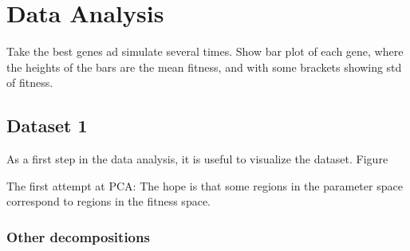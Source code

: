 
\chapter{Data Analysis} %

\label{chapter:model} %
	

Take the best genes ad simulate several times. Show bar plot of each gene, where the heights of the bars are the mean fitness, and with some brackets showing std of fitness.

\section{Dataset 1}

As a first step in the data analysis, it is useful to visualize the dataset. Figure 

The first attempt at PCA: The hope is that some regions in the parameter space correspond to regions in the fitness space. 
\begin{comment}
\begin{figure}
	\centering
	\subcaptionbox{\label{subfig:}}
	[0.49\linewidth]{\texttt{[image: issue\_21\_b.png]}}
	\subcaptionbox{\label{subfig:}}
	[0.49\linewidth]{\texttt{[image: issue\_21\_c.png]}}
	\subcaptionbox{\label{subfig:}}
	[0.49\linewidth]{\texttt{[image: issue\_21\_d.png]}}
	\subcaptionbox{\label{subfig:}}
	[0.49\linewidth]{\texttt{[image: issue\_21\_e.png]}}

	\caption{Scatter plots for dataset 1}\label{fig:scatter_plot_dataset1}
	\label{sub:other_decompositions}
\end{figure}


\end{comment}



\subsection{Other decompositions} %
